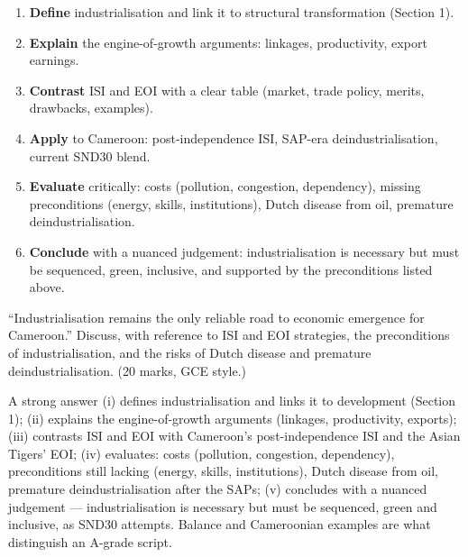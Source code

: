 \documentclass[11pt]{article}
\begin{document}
\begin{methode}
\begin{enumerate}
\item \textbf{Define} industrialisation and link it to structural transformation (Section 1).
\item \textbf{Explain} the engine-of-growth arguments: linkages, productivity, export earnings.
\item \textbf{Contrast} ISI and EOI with a clear table (market, trade policy, merits, drawbacks, examples).
\item \textbf{Apply} to Cameroon: post-independence ISI, SAP-era deindustrialisation, current SND30 blend.
\item \textbf{Evaluate} critically: costs (pollution, congestion, dependency), missing preconditions (energy, skills, institutions), Dutch disease from oil, premature deindustrialisation.
\item \textbf{Conclude} with a nuanced judgement: industrialisation is necessary but must be sequenced, green, inclusive, and supported by the preconditions listed above.
\end{enumerate}
\end{methode}

\begin{exercice}
``Industrialisation remains the only reliable road to economic emergence for Cameroon.'' Discuss, with reference to ISI and EOI strategies, the preconditions of industrialisation, and the risks of Dutch disease and premature deindustrialisation. (20 marks, GCE style.)
\end{exercice}

\begin{corrige}
A strong answer (i) defines industrialisation and links it to development (Section 1); (ii) explains the engine-of-growth arguments (linkages, productivity, exports); (iii) contrasts ISI and EOI with Cameroon's post-independence ISI and the Asian Tigers' EOI; (iv) evaluates: costs (pollution, congestion, dependency), preconditions still lacking (energy, skills, institutions), Dutch disease from oil, premature deindustrialisation after the SAPs; (v) concludes with a nuanced judgement — industrialisation is necessary but must be sequenced, green and inclusive, as SND30 attempts. Balance and Cameroonian examples are what distinguish an A-grade script.
\end{corrige}
\end{document}
